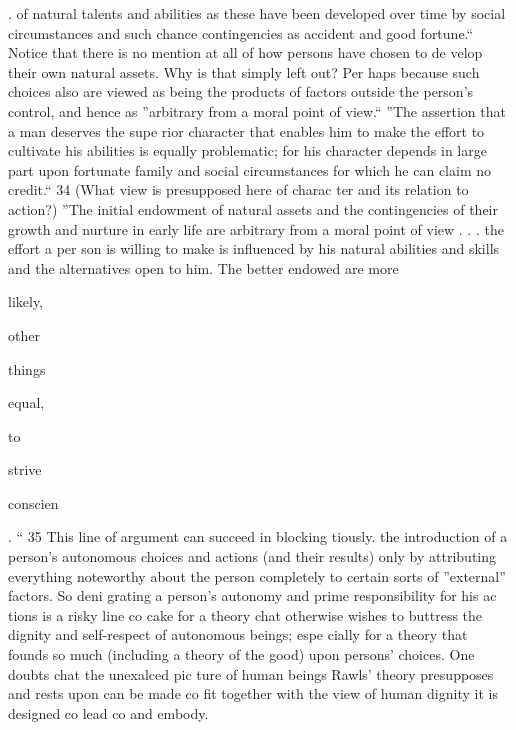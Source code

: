 \documentclass[11pt,openany]{book}
\begin{document}
. of natural talents and abilities as these have been developed over time by social circumstances and such chance contingencies as accident and good fortune.`` Notice that there is no mention at all of how persons have chosen to de velop their own natural assets. Why is that simply left out? Per haps because such choices also are viewed as being the products of factors outside the person's control, and hence as ''arbitrary from a moral point of view.`` ''The assertion that a man deserves the supe rior character that enables him to make the effort to cultivate his abilities is equally problematic; for his character depends in large part upon fortunate family and social circumstances for which he can claim no credit.`` 34 (What view is presupposed here of charac ter and its relation to action?) ''The initial endowment of natural assets and the contingencies of their growth and nurture in early life are arbitrary from a moral point of view . . . the effort a per son is willing to make is influenced by his natural abilities and skills and the alternatives open to him. The better endowed are more 

likely, 

other 

things 

equal, 

to 

strive 

conscien

. `` 35 This line of argument can succeed in blocking tiously. the introduction of a person's autonomous choices and actions (and their results) only by attributing everything noteworthy about the person completely to certain sorts of ''external'' factors. So deni grating a person's autonomy and prime responsibility for his ac tions is a risky line co cake for a theory chat otherwise wishes to buttress the dignity and self-respect of autonomous beings; espe cially for a theory that founds so much (including a theory of the good) upon persons' choices. One doubts chat the unexalced pic ture of human beings Rawls' theory presupposes and rests upon can be made co fit together with the view of human dignity it is designed co lead co and embody. 
\end{document}
